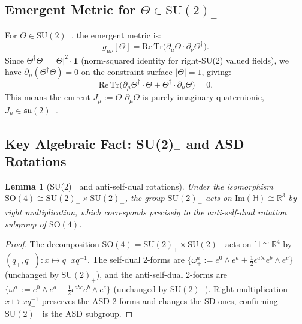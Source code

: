 \documentclass[11pt,a4paper]{article}
\newtheorem{lemma}[theorem]{Lemma}
\theoremstyle{definition}
\theoremstyle{remark}
\begin{document}
\subsection{Emergent Metric for $\Theta \in \mathrm{SU}(2)_-$}

For $\Theta \in \mathrm{SU}(2)_-$, the emergent metric is:
\begin{equation}
  g_{\mu\nu}[\Theta]
  = \mathrm{Re}\,\mathrm{Tr}\!\bigl(\partial_\mu\Theta\cdot\partial_\nu\Theta^\dagger\bigr).
  \label{eq:metric_su2}
\end{equation}
Since $\Theta^\dagger\Theta = |\Theta|^2\cdot\mathbf{1}$ (norm-squared identity for
right-SU(2) valued fields), we have $\partial_\mu(\Theta^\dagger\Theta) = 0$
on the constraint surface $|\Theta| = 1$, giving:
\begin{equation}
  \mathrm{Re}\,\mathrm{Tr}\!\bigl(\partial_\mu\Theta^\dagger\cdot\Theta +
  \Theta^\dagger\cdot\partial_\mu\Theta\bigr) = 0.
  \label{eq:constraint}
\end{equation}
This means the current $J_\mu := \Theta^\dagger\partial_\mu\Theta$ is purely
imaginary-quaternionic, $J_\mu \in \mathfrak{su}(2)_-$.

\subsection{Key Algebraic Fact: SU(2)$_-$ and ASD Rotations}

\begin{lemma}[SU(2)$_-$ and anti-self-dual rotations]
\label{lem:su2_asd}
Under the isomorphism $\mathrm{SO}(4) \cong \mathrm{SU}(2)_+ \times \mathrm{SU}(2)_-$,
the group $\mathrm{SU}(2)_-$ acts on $\mathrm{Im}(\mathbb{H}) \cong \mathbb{R}^3$
by right multiplication, which corresponds precisely to the
\emph{anti-self-dual} rotation subgroup of $\mathrm{SO}(4)$.
\end{lemma}

\begin{proof}
The decomposition $\mathrm{SO}(4) = \mathrm{SU}(2)_+ \times \mathrm{SU}(2)_-$
acts on $\mathbb{H} \cong \mathbb{R}^4$ by $(q_+, q_-) : x \mapsto q_+ x q_-^{-1}$.
The self-dual 2-forms are $\{\omega^{a}_+ := e^0\wedge e^a + \tfrac{1}{2}\epsilon^{abc}
e^b\wedge e^c\}$ (unchanged by $\mathrm{SU}(2)_+$), and the anti-self-dual
2-forms are $\{\omega^{a}_- := e^0\wedge e^a - \tfrac{1}{2}\epsilon^{abc}e^b\wedge e^c\}$
(unchanged by $\mathrm{SU}(2)_-$).  Right multiplication $x \mapsto x q_-^{-1}$
preserves the ASD 2-forms and changes the SD ones, confirming $\mathrm{SU}(2)_-$
is the ASD subgroup.
\end{proof}
\end{document}
